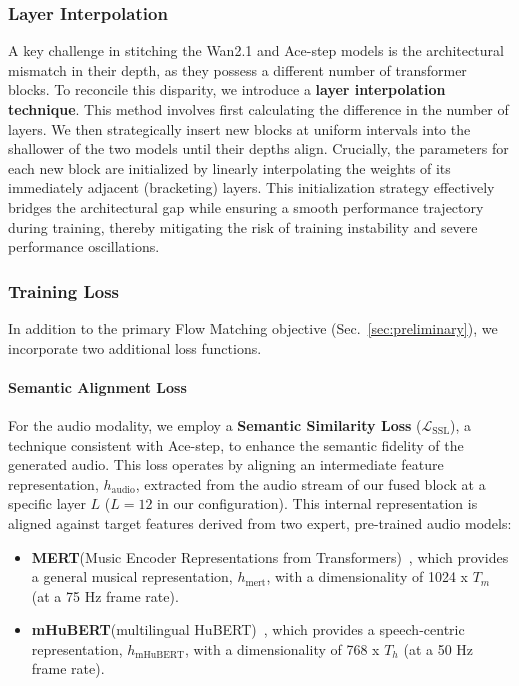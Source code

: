 \subsubsection{Layer Interpolation} A key challenge in stitching the Wan2.1 and Ace-step models is the architectural mismatch in their depth, as they possess a different number of transformer blocks. To reconcile this disparity, we introduce a \textbf{layer interpolation technique}.
This method involves first calculating the difference in the number of layers. We then strategically insert new blocks at uniform intervals into the shallower of the two models until their depths align. Crucially, the parameters for each new block are initialized by linearly interpolating the weights of its immediately adjacent (bracketing) layers. This initialization strategy effectively bridges the architectural gap while ensuring a smooth performance trajectory during training, thereby mitigating the risk of training instability and severe performance oscillations.
\subsubsection{Training Loss}
In addition to the primary Flow Matching objective (Sec.~\ref{sec:preliminary}), we incorporate two additional loss functions.
\paragraph{Semantic Alignment Loss}
For the audio modality, we employ a \textbf{Semantic Similarity Loss} ($\mathcal{L}_{\text{SSL}}$), a technique consistent with Ace-step, to enhance the semantic fidelity of the generated audio. This loss operates by aligning an intermediate feature representation, $h_{\text{audio}}$, extracted from the audio stream of our fused block at a specific layer $L$ ($L=12$ in our configuration). This internal representation is aligned against target features derived from two expert, pre-trained audio models:

\begin{itemize}[leftmargin=*]
    \item \textbf{MERT}(Music Encoder Representations from Transformers)~\cite{li2023mert}, which provides a general musical representation, $h_{\text{mert}}$, with a dimensionality of 1024 x $T_m$ (at a 75 Hz frame rate).
    \item \textbf{mHuBERT}(multilingual HuBERT)~\cite{boito2024mhubert}, which provides a speech-centric representation, $h_{\text{mHuBERT}}$, with a dimensionality of 768 x $T_h$ (at a 50 Hz frame rate).
\end{itemize}

